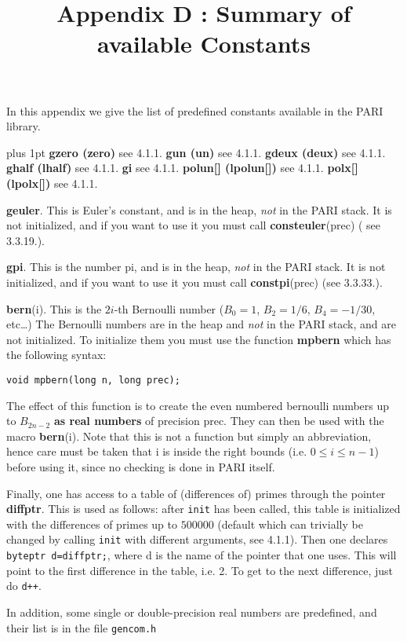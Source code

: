 \title{Appendix D : Summary of available Constants}

In this appendix we give the list of predefined constants available in the
PARI library. 

{\obeylines\parskip=0pt plus 1pt
\hbox{}
{\bf gzero (zero)} see 4.1.1.
{\bf gun (un)} see 4.1.1.
{\bf gdeux (deux)} see 4.1.1.
{\bf ghalf (lhalf)} see 4.1.1.
{\bf gi} see 4.1.1.
{\bf polun[] (lpolun[])} see 4.1.1.
{\bf polx[] (lpolx[])} see 4.1.1.}

{\bf geuler}. This is Euler's constant, and is in the heap, {\it not\/}
in the PARI stack. It is not initialized, and if you want to use it you must
call {\bf consteuler}(prec) ( see 3.3.19.).

{\bf gpi}. This is the number pi, and is in the heap, {\it not\/}
in the PARI stack. It is not initialized, and if you want to use it you must
call {\bf constpi}(prec) (see 3.3.33.).

{\bf bern}(i). This is the $2i$-th Bernoulli number ($B_0=1$, $B_2=1/6$,
$B_4=-1/30$, etc\dots) The Bernoulli numbers are
in the heap and {\it not\/} in the PARI stack, and are not initialized.
To initialize them you must use the function {\bf mpbern} which has the following
syntax:

{\tt void mpbern(long n, long prec);}

The effect of this function is to create the even numbered bernoulli numbers up
to $B_{2n-2}$ {\bf as real numbers} of precision prec. They can then be used with
the macro {\bf bern}(i). Note that this is not a function but simply an abbreviation,
hence care must be taken that i is inside the right bounds (i.e. $0\le i\le n-1$)
before using it, since no checking is done in PARI itself.

Finally, one has access to a table of (differences of) primes through the
pointer {\bf diffptr}. This is used as follows: after {\tt init} has been
called, this table is initialized with the differences of primes up to $500000$
(default which can trivially be changed by calling {\tt init} with different
arguments, see 4.1.1). Then one declares {\tt byteptr d=diffptr;}, where d is
the name of the pointer that one uses. This will point to the first difference
in the table, i.e. 2. To get to the next difference, just do {\tt d++}.

In addition, some single or double-precision real numbers are predefined,
and their list is in the file {\tt gencom.h}


\vfill\eject
